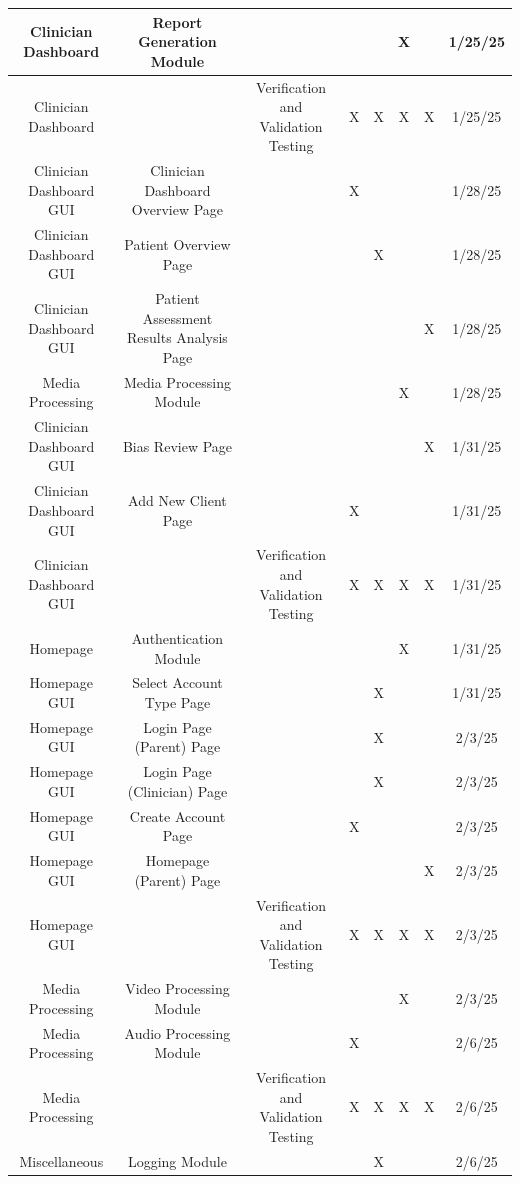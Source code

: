 \documentclass[12pt, titlepage]{article}
\begin{document}
\begin{landscape}
\begin{longtable}{|c|c|c|c|c|c|c|c|}
      Clinician Dashboard & Report Generation Module & ~ & ~ & ~ & X & ~ & 1/25/25 \\ \hline
      Clinician Dashboard & ~ & Verification and Validation Testing & X & X & X & X & 1/25/25 \\ \hline
      Clinician Dashboard GUI & Clinician Dashboard Overview Page & ~ & X & ~ & ~ & ~ & 1/28/25 \\ \hline
      Clinician Dashboard GUI & Patient Overview Page & ~ & ~ & X & ~ & ~ & 1/28/25 \\ \hline
      Clinician Dashboard GUI & Patient Assessment Results Analysis Page & ~ & ~ & ~ & ~ & X & 1/28/25 \\ \hline
      Media Processing & Media Processing Module & ~ & ~ & ~ & X & ~ & 1/28/25 \\ \hline
      Clinician Dashboard GUI & Bias Review Page & ~ & ~ & ~ & ~ & X & 1/31/25 \\ \hline
      Clinician Dashboard GUI & Add New Client Page & ~ & X & ~ & ~ & ~ & 1/31/25 \\ \hline
      Clinician Dashboard GUI & ~ & Verification and Validation Testing & X & X & X & X & 1/31/25 \\ \hline
      Homepage & Authentication Module & ~ & ~ & ~ & X & ~ & 1/31/25 \\ \hline
      Homepage GUI & Select Account Type Page & ~ & ~ & X & ~ & ~ & 1/31/25 \\ \hline
      Homepage GUI & Login Page (Parent) Page & ~ & ~ & X & ~ & ~ & 2/3/25 \\ \hline
      Homepage GUI & Login Page (Clinician) Page & ~ & ~ & X & ~ & ~ & 2/3/25 \\ \hline
      Homepage GUI & Create Account Page & ~ & X & ~ & ~ & ~ & 2/3/25 \\ \hline
      Homepage GUI & Homepage (Parent) Page & ~ & ~ & ~ & ~ & X & 2/3/25 \\ \hline
      Homepage GUI & ~ & Verification and Validation Testing & X & X & X & X & 2/3/25 \\ \hline
      Media Processing & Video Processing Module & ~ & ~ & ~ & X & ~ & 2/3/25 \\ \hline
      Media Processing & Audio Processing Module & ~ & X & ~ & ~ & ~ & 2/6/25 \\ \hline
      Media Processing & ~ & Verification and Validation Testing & X & X & X & X & 2/6/25 \\ \hline
      Miscellaneous & Logging Module & ~ & ~ & X & ~ & ~ & 2/6/25 \\ \hline

\end{longtable}
\end{landscape}
\end{document}
